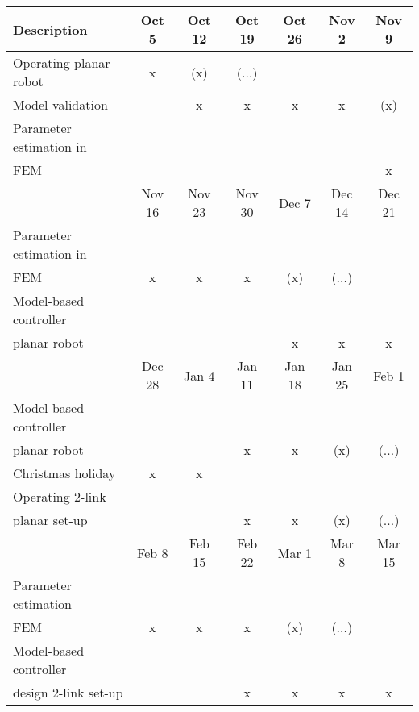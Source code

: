 
\begin{table}[H]
    \centering
    \begin{tabular}{p{4.8cm}cccccc} \hline
      \textbf{Description}                     & Oct 5   & Oct 12   & Oct 19   & Oct 26 & Nov 2  & Nov 9  \\ \hline
      Operating planar robot                   &     x   &   (x)    & ($\dots$)&        &        &         \\
      Model validation                         &         &    x     &      x   &  x     &  x     & (x)     \\ 
      Parameter estimation in \\ FEM           &         &          &          &        &        &  x      \\  \hline
      
                                              & Nov 16  & Nov 23   & Nov 30   & Dec 7 & Dec 14  & Dec 21  \\ \hline
     Parameter estimation in \\ FEM            &   x     &    x     &  x       & (x)    &   ($\dots$)     &        \\  
     Model-based controller \\ planar robot    &         &          &          &  x     &   x    &   x      \\ \hline        
  
                                               &  Dec 28 & Jan 4   & Jan 11   & Jan 18  & Jan 25   & Feb 1 \\ \hline
     Model-based controller \\ planar robot    &         &         &     x     &  x     & (x)      &  ($\dots$)  \\ 
     Christmas holiday                         &   x     &     x   &          &         &          &          \\       
     Operating 2-link  \\planar  set-up        &         &         &     x    &   x     &  (x)     & ($\dots$)  \\ \hline 
     
                                               & Feb 8   & Feb 15  & Feb 22  & Mar 1    & Mar 8    & Mar 15  \\ \hline
     Parameter estimation \\ FEM               &  x     &   x      &  x      &  (x)     & ($\dots$) &           \\
     Model-based controller \\ design 2-link set-up    &     &       &     x    &   x    &     x &     x    \\    \hline



\end{tabular}
\end{table}

